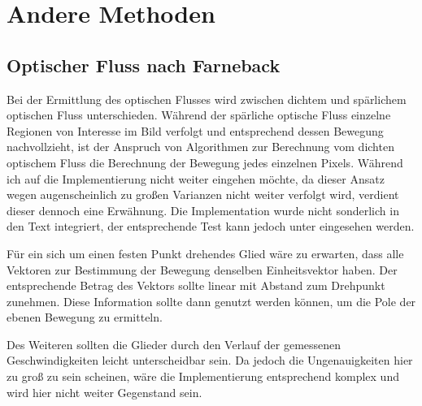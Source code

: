 \section{Andere Methoden}

\subsection{Optischer Fluss nach Farneback}

Bei der Ermittlung des optischen Flusses wird zwischen dichtem und spärlichem optischen Fluss unterschieden.
Während der spärliche optische Fluss einzelne Regionen von Interesse im Bild verfolgt und entsprechend dessen Bewegung nachvollzieht, ist der Anspruch von Algorithmen zur Berechnung vom dichten optischem Fluss die Berechnung der Bewegung jedes einzelnen Pixels.
Während ich auf die Implementierung nicht weiter eingehen möchte, da dieser Ansatz wegen augenscheinlich zu gro{\ss}en Varianzen nicht weiter verfolgt wird, verdient dieser dennoch eine Erwähnung.
Die Implementation wurde nicht sonderlich in den Text integriert, der entsprechende Test kann jedoch unter  eingesehen werden.

Für ein sich um einen festen Punkt drehendes Glied wäre zu erwarten, dass alle Vektoren zur Bestimmung der Bewegung denselben Einheitsvektor haben.
Der entsprechende Betrag des Vektors sollte linear mit Abstand zum Drehpunkt zunehmen.
Diese Information sollte dann genutzt werden können, um die Pole der ebenen Bewegung zu ermitteln.

Des Weiteren sollten die Glieder durch den Verlauf der gemessenen Geschwindigkeiten leicht unterscheidbar sein.
Da jedoch die Ungenauigkeiten hier zu gro{\ss} zu sein scheinen, wäre die Implementierung entsprechend komplex und wird hier nicht weiter Gegenstand sein.

